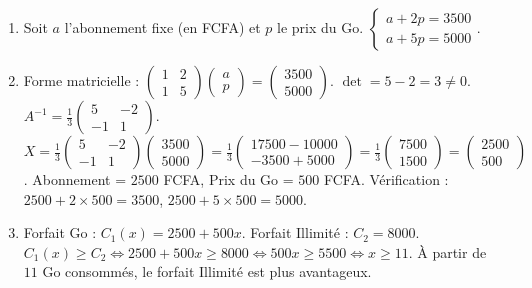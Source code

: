 \documentclass[11pt]{article}
\begin{document}
\begin{corrige}[Exercice 4]
\begin{enumerate}
\item Soit $a$ l'abonnement fixe (en FCFA) et $p$ le prix du Go.
$\begin{cases} a + 2p = 3500 \\ a + 5p = 5000 \end{cases}$.
\item Forme matricielle : $\begin{pmatrix} 1 & 2 \\ 1 & 5 \end{pmatrix}\begin{pmatrix} a \\ p \end{pmatrix}=\begin{pmatrix} 3500 \\ 5000 \end{pmatrix}$.
$\det = 5-2=3\neq 0$.
$A^{-1}=\frac{1}{3}\begin{pmatrix} 5 & -2 \\ -1 & 1 \end{pmatrix}$.
$X=\frac{1}{3}\begin{pmatrix} 5 & -2 \\ -1 & 1 \end{pmatrix}\begin{pmatrix} 3500 \\ 5000 \end{pmatrix}=\frac{1}{3}\begin{pmatrix} 17500-10000 \\ -3500+5000 \end{pmatrix}=\frac{1}{3}\begin{pmatrix} 7500 \\ 1500 \end{pmatrix}=\begin{pmatrix} 2500 \\ 500 \end{pmatrix}$.
Abonnement = $\num{2500}$ FCFA, Prix du Go = $\num{500}$ FCFA.
Vérification : $2500+2\times500=3500$, $2500+5\times500=5000$.
\item Forfait Go : $C_1(x)=2500+500x$. Forfait Illimité : $C_2=8000$.
$C_1(x) \ge C_2 \iff 2500+500x \ge 8000 \iff 500x \ge 5500 \iff x \ge 11$.
À partir de $11$ Go consommés, le forfait Illimité est plus avantageux.
\end{enumerate}
\end{corrige}

\newpage
\end{document}
